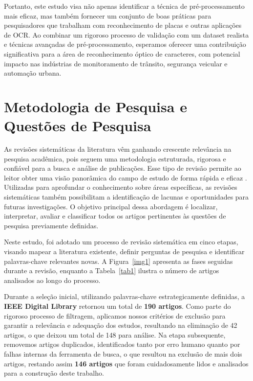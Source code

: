 \documentclass[conference]{IEEEtran}
\begin{document}
Portanto, este estudo visa não apenas identificar a técnica de pré-processamento mais eficaz, mas também fornecer um conjunto de boas práticas para pesquisadores que trabalham com reconhecimento de placas e outras aplicações de OCR. Ao combinar um rigoroso processo de validação com um dataset realista e técnicas avançadas de pré-processamento, esperamos oferecer uma contribuição significativa para a área de reconhecimento óptico de caracteres, com potencial impacto nas indústrias de monitoramento de trânsito, segurança veicular e automação urbana. 

\section{Metodologia de Pesquisa e Questões de Pesquisa}

As revisões sistemáticas da literatura vêm ganhando crescente relevância na pesquisa acadêmica, pois seguem uma metodologia estruturada, rigorosa e confiável para a busca e análise de publicações. Esse tipo de revisão permite ao leitor obter uma visão panorâmica do campo de estudo de forma rápida e eficaz \cite{b4}. Utilizadas para aprofundar o conhecimento sobre áreas específicas, as revisões sistemáticas também possibilitam a identificação de lacunas e oportunidades para futuras investigações. O objetivo principal dessa abordagem é localizar, interpretar, avaliar e classificar todos os artigos pertinentes às questões de pesquisa previamente definidas.

Neste estudo, foi adotado um processo de revisão sistemática em cinco etapas, visando mapear a literatura existente, definir perguntas de pesquisa e identificar palavras-chave relevantes novas. A Figura~\ref{img1} apresenta as fases seguidas durante a revisão, enquanto a Tabela~\ref{tab1} ilustra o número de artigos analisados ao longo do processo.

Durante a seleção inicial, utilizando palavras-chave estrategicamente definidas, a \textbf{IEEE Digital Library} retornou um total de \textbf{190 artigos}. Como parte do rigoroso processo de filtragem, aplicamos nossos critérios de exclusão para garantir a relevância e adequação dos estudos, resultando na eliminação de 42 artigos, o que deixou um total de 148 para análise. Na etapa subsequente, removemos artigos duplicados, identificados tanto por erro humano quanto por falhas internas da ferramenta de busca, o que resultou na exclusão de mais dois artigos, restando assim \textbf{146 artigos} que foram cuidadosamente lidos e analisados para a construção deste trabalho.
\end{document}
